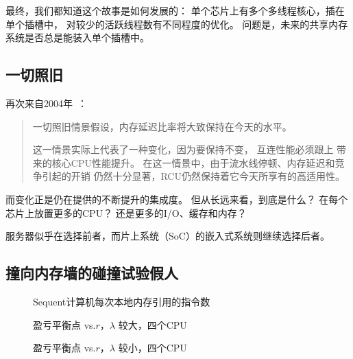 最终，我们都知道这个故事是如何发展的：
单个芯片上有多个多线程核心，插在单个插槽中，
对较少的活跃线程数有不同程度的优化。
问题是，未来的共享内存系统是否总是能装入单个插槽中。

\subsection{一切照旧}
\label{sec:meas:More of the Same}

再次来自2004年~\cite{PaulEdwardMcKenneyPhD}：

\begin{quote}
	一切照旧情景假设，内存延迟比率将大致保持在今天的水平。

	这一情景实际上代表了一种变化，因为要保持不变，
	互连性能必须跟上
	带来的核心CPU性能提升。
	在这一情景中，由于流水线停顿、内存延迟和竞争引起的开销
	仍然十分显著，RCU仍然保持着它今天所享有的高适用性。
\end{quote}

而变化正是仍在提供的不断提升的集成度。
但从长远来看，到底是什么？
在每个芯片上放置更多的CPU？
还是更多的I/O、缓存和内存？

服务器似乎在选择前者，而片上系统（SoC）的嵌入式系统则继续选择后者。

\subsection{撞向内存墙的碰撞试验假人}
\label{sec:future:Crash Dummies Slamming into the Memory Wall}

\begin{figure}
\centering
\epsfxsize=3in
\caption{Sequent计算机每次本地内存引用的指令数}
\label{fig:future:Instructions per Local Memory Reference for Sequent Computers}
\end{figure}

\begin{figure}
\centering
\epsfxsize=3in
\caption{盈亏平衡点 vs.\@ $r$，$\lambda$ 较大，四个CPU}
\label{fig:future:Breakevens vs. r; lambda Large; Four CPUs}
\end{figure}

\begin{figure}
\centering
\epsfxsize=3in
\caption{盈亏平衡点 vs.\@ $r$，$\lambda$ 较小，四个CPU}
\label{fig:future:Breakevens vs. r; Worst-Case lambda; Four CPUs}
\end{figure}

